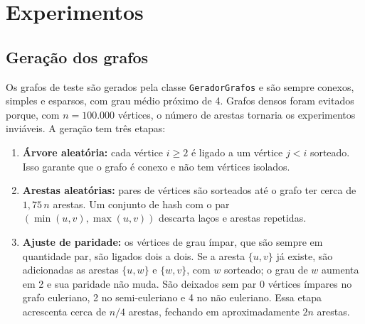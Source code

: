 
\newcommand{\graficoTempo}[2]{%
  \begin{tikzpicture}
    \begin{loglogaxis}[
        width=0.48\textwidth,
        title={#2},
        xlabel={Vértices ($n$)},
        ylabel={Tempo médio (ms)},
        grid=major,
        legend pos=north west,
        legend style={font=\small},
        unbounded coords=discard,
        table/col sep=comma,
      ]
      \addplot+[mark=*] table[x=n, y=naive_ms] {dados/#1.csv};
      \addplot+[mark=square*] table[x=n, y=tarjan_ms] {dados/#1.csv};
      \legend{Ingênuo, Tarjan}
    \end{loglogaxis}
  \end{tikzpicture}%
}

\section{Experimentos}

\subsection{Geração dos grafos}

Os grafos de teste são gerados pela classe \texttt{GeradorGrafos} e são sempre conexos, simples e esparsos, com grau médio próximo de 4. Grafos densos foram evitados porque, com $n = 100.000$ vértices, o número de arestas tornaria os experimentos inviáveis. A geração tem três etapas:

\begin{enumerate}
  \item \textbf{Árvore aleatória:} cada vértice $i \geq 2$ é ligado a um vértice $j < i$ sorteado. Isso garante que o grafo é conexo e não tem vértices isolados.
  \item \textbf{Arestas aleatórias:} pares de vértices são sorteados até o grafo ter cerca de $1{,}75\,n$ arestas. Um conjunto de hash com o par $(\min(u,v), \max(u,v))$ descarta laços e arestas repetidas.
  \item \textbf{Ajuste de paridade:} os vértices de grau ímpar, que são sempre em quantidade par, são ligados dois a dois. Se a aresta $\{u, v\}$ já existe, são adicionadas as arestas $\{u, w\}$ e $\{w, v\}$, com $w$ sorteado; o grau de $w$ aumenta em 2 e sua paridade não muda. São deixados sem par 0 vértices ímpares no grafo euleriano, 2 no semi-euleriano e 4 no não euleriano. Essa etapa acrescenta cerca de $n/4$ arestas, fechando em aproximadamente $2n$ arestas.
\end{enumerate}

